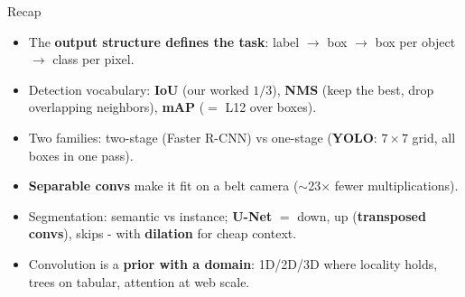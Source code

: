 \documentclass[aspectratio=169]{beamer}
\begin{document}
\begin{frame}{Recap}
  \begin{itemize}
    \item The \textbf{output structure defines the task}: label $\to$ box $\to$ box per
      object $\to$ class per pixel.
    \item Detection vocabulary: \textbf{IoU} (our worked $1/3$), \textbf{NMS} (keep the
      best, drop overlapping neighbors), \textbf{mAP} ($=$ L12 over boxes).
    \item Two families: two-stage (Faster R-CNN) vs one-stage (\textbf{YOLO}: $7\times7$
      grid, all boxes in one pass).
    \item \textbf{Separable convs} make it fit on a belt camera ($\sim$23$\times$ fewer
      multiplications).
    \item Segmentation: semantic vs instance; \textbf{U-Net} $=$ down, up
      (\textbf{transposed convs}), skips - with \textbf{dilation} for cheap context.
    \item Convolution is a \textbf{prior with a domain}: 1D/2D/3D where locality holds,
      trees on tabular, attention at web scale.
  \end{itemize}
  \vskip 6pt
\end{frame}
\end{document}
